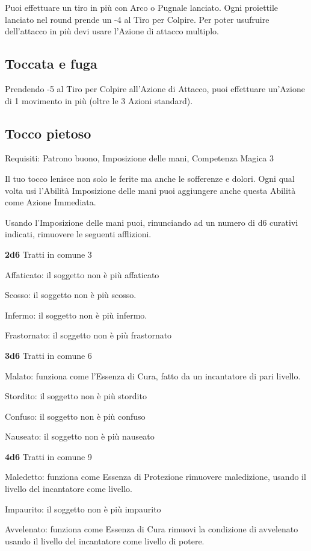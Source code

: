 \documentclass[a4paper,11pt,twoside,openany]{book}
\begin{document}
Puoi effettuare un tiro in più con Arco o Pugnale lanciato. Ogni
proiettile lanciato nel round prende un -4 al Tiro per Colpire. Per
poter usufruire dell'attacco in più devi usare l'Azione di attacco
multiplo.

\subsection{Toccata e fuga}

Prendendo -5 al Tiro per Colpire all'Azione di Attacco, puoi effettuare un'Azione di 1 movimento in più (oltre le 3 Azioni standard).

\subsection{Tocco pietoso}

Requisiti: Patrono buono, Imposizione delle mani, Competenza Magica 3

Il tuo tocco lenisce non solo le ferite ma anche le sofferenze e dolori. Ogni qual volta usi l'Abilità Imposizione delle mani puoi aggiungere anche questa Abilità come Azione Immediata.

Usando l'Imposizione delle mani puoi, rinunciando ad un numero di d6 curativi indicati, rimuovere le seguenti afflizioni.

\textbf{2d6} Tratti in comune 3

Affaticato: il soggetto non è più affaticato

Scosso: il soggetto non è più scosso.

Infermo: il soggetto non è più infermo.

Frastornato: il soggetto non è più frastornato

\textbf{3d6} Tratti in comune 6

Malato: funziona come l'Essenza di Cura, fatto da un incantatore di pari livello.

Stordito: il soggetto non è più stordito

Confuso: il soggetto non è più confuso

Nauseato: il soggetto non è più nauseato

\textbf{4d6} Tratti in comune 9

Maledetto: funziona come Essenza di Protezione rimuovere maledizione, usando il livello del incantatore come livello.

Impaurito: il soggetto non è più impaurito

Avvelenato: funziona come Essenza di Cura rimuovi la condizione di avvelenato usando il livello del incantatore come livello di potere.
\end{document}
